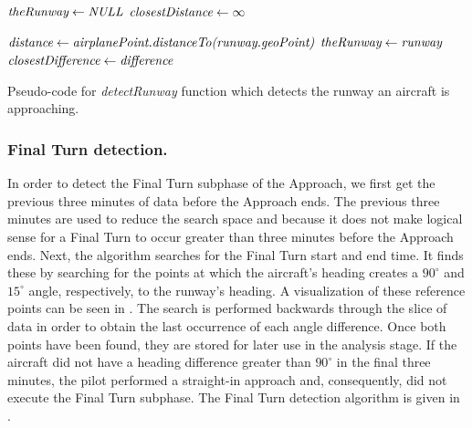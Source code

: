             \begin{algorithm}
                \begin{algorithmic}[1]\raggedright
                        \State $ \textit{theRunway} \gets \textit{NULL} $
                        \State $ \textit{closestDistance} \gets \infty $

                                \State $ \textit{distance} \gets \textit{airplanePoint.distanceTo(runway.geoPoint)} $
                                    \State $ \textit{theRunway} \gets \textit{runway} $
                                    \State $ \textit{closestDifference} \gets \textit{difference} $
                                \EndIf
                            \EndIf
                        \EndFor

                        \State {}
                    \EndFunction
                \end{algorithmic}
                \caption{Pseudo-code for \textit{detectRunway} function which detects the runway an aircraft is approaching.}
                \label{alg:detect_runway}
            \end{algorithm}
        
        
        \subsubsection{Final Turn detection.}
        
        	In order to detect the Final Turn subphase of the Approach, we first get the previous three minutes of data before the Approach ends.  The previous three minutes are used to reduce the search space and because it does not make logical sense for a Final Turn to occur greater than three minutes before the Approach ends.  Next, the algorithm searches for the Final Turn start and end time.  It finds these by searching for the points at which the aircraft's heading creates a $90^\circ$ and $15^\circ$ angle, respectively, to the runway's heading.  A visualization of these reference points can be seen in .  The search is performed backwards through the slice of data in order to obtain the last occurrence of each angle difference.  Once both points have been found, they are stored for later use in the analysis stage.  If the aircraft did not have a heading difference greater than $90^\circ$ in the final three minutes, the pilot performed a straight-in approach and, consequently, did not execute the Final Turn subphase.
        	The Final Turn detection algorithm is given in .
            
